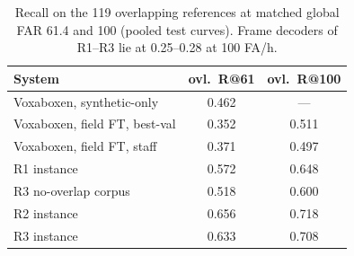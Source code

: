 \documentclass[10pt,twocolumn]{article}
\begin{document}
\begin{table}[t]
\centering\footnotesize
\caption{Recall on the 119 overlapping references at matched global FAR 61.4 and 100 (pooled test curves). Frame decoders of R1--R3 lie at 0.25--0.28 at 100 FA/h.}
\label{tab:overlap}
\setlength{\tabcolsep}{4pt}
\begin{tabular}{lcc}
\toprule
System & ovl.\ R@61 & ovl.\ R@100\\
\midrule
Voxaboxen, synthetic-only & 0.462 & ---\\
Voxaboxen, field FT, best-val & 0.352 & 0.511\\
Voxaboxen, field FT, staff & 0.371 & 0.497\\
R1 instance & 0.572 & 0.648\\
R3 no-overlap corpus & 0.518 & 0.600\\
R2 instance & 0.656 & 0.718\\
R3 instance & 0.633 & 0.708\\
\bottomrule
\end{tabular}
\end{table}

\begin{table}[t]
\centering\footnotesize
\caption{Seed spread: operating-point recall / test FAR / recall on overlapping references at the operating point, per pretraining seed (instance decoder).}
\label{tab:seeds}
\setlength{\tabcolsep}{3pt}
\end{table}
\end{document}
